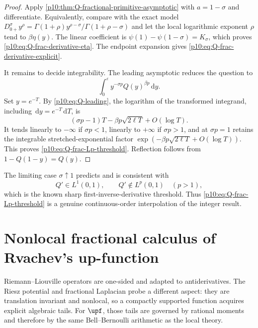 \documentclass[11pt,oneside]{article}
\theoremstyle{definition}
\theoremstyle{remark}
\newcommand{\Q}{Q}
\newcommand{\dd}{\,\mathrm d}
\newcommand{\1}{\mathbf 1}
\begin{document}
\begin{proof}
Apply \cref{p10:thm:Q-fractional-primitive-asymptotic} with \(a=1-\sigma\) and
differentiate.  Equivalently, compare with the exact model
\(
 D_{0+}^{\sigma}y^\rho
 =\Gamma(1+\rho)y^{\rho-\sigma}/\Gamma(1+\rho-\sigma)
\)
and let the local logarithmic exponent \(\rho\) tend to \(\beta\eta(y)\).  The
linear coefficient is
\(
 \psi(1)-\psi(1-\sigma)=K_\sigma
\), which proves \eqref{p10:eq:Q-frac-derivative-eta}.  The endpoint expansion gives
\eqref{p10:eq:Q-frac-derivative-explicit}.

It remains to decide integrability.  The leading asymptotic reduces the question to
\begin{equation}\label{p10:eq:critical-integral}
 \int_0^\varepsilon y^{-\sigma p}\Q(y)^{\beta p}\dd y.
\end{equation}
Set \(y=e^{-T}\).  By \eqref{p10:eq:Q-leading}, the logarithm of the transformed
integrand, including \(\dd y=e^{-T}\dd T\), is
\begin{equation}\label{p10:eq:critical-exponent}
 (\sigma p-1)T-\beta p\sqrt{2\ell T}+O(\log T).
\end{equation}
It tends linearly to \(-\infty\) if \(\sigma p<1\), linearly to \(+\infty\) if
\(\sigma p>1\), and at \(\sigma p=1\) retains the integrable stretched-exponential
factor \(\exp(-\beta p\sqrt{2\ell T}+O(\log T))\).  This proves
\eqref{p10:eq:Q-frac-Lp-threshold}.  Reflection follows from
\(1-\Q(1-y)=\Q(y)\).
\end{proof}

\begin{corollary}\label{p10:cor:Qprime-critical}
The limiting case \(\sigma\uparrow1\) predicts and is consistent with
\begin{equation}\label{p10:eq:Qprime-Lp}
 \Q'\in L^1(0,1),
 \qquad
 \Q'\notin L^p(0,1)\quad(p>1),
\end{equation}
which is the known sharp first-inverse-derivative threshold.  Thus
\eqref{p10:eq:Q-frac-Lp-threshold} is a genuine continuous-order interpolation of the
integer result.
\end{corollary}

\section{Nonlocal fractional calculus of Rvachev's up-function}
\label{p10:sec:up-nonlocal-fractional}

Riemann--Liouville operators are one-sided and adapted to antiderivatives.  The Riesz
potential and fractional Laplacian probe a different aspect: they are translation
invariant and nonlocal, so a compactly supported function acquires explicit algebraic
tails.  For \(\upf\), those tails are governed by rational moments and therefore by the
same Bell--Bernoulli arithmetic as the local theory.
\end{document}
